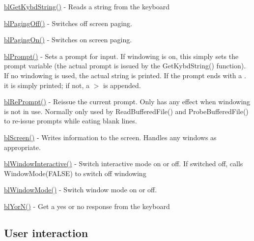\begin{DoxyItemize}
\item \hyperlink{_wind_i_o_8c_a2287dad2ad5b0cc2da7febccbb381883}{bl\-Get\-Kybd\-String()} -\/ Reads a string from the keyboard
\item \hyperlink{_wind_i_o_8c_a9cb4c1f0af3d1a43344ea43e7afc06d6}{bl\-Paging\-Off()} -\/ Switches off screen paging.
\item \hyperlink{_wind_i_o_8c_adf5e91712535d73909121b7b676b5af8}{bl\-Paging\-On()} -\/ Switches on screen paging.
\item \hyperlink{_wind_i_o_8c_ad7d9c635098851044f5e311e73c70ead}{bl\-Prompt()} -\/ Sets a prompt for input. If windowing is on, this simply sets the prompt variable (the actual prompt is issued by the Get\-Kybd\-String() function). If no windowing is used, the actual string is printed. If the prompt ends with a . it is simply printed; if not, a $>$ is appended.
\item \hyperlink{_wind_i_o_8c_a64719533d3bc93c3763afe7461a22844}{bl\-Re\-Prompt()} -\/ Reissue the current prompt. Only has any effect when windowing is not in use. Normally only used by Read\-Buffered\-File() and Probe\-Buffered\-File() to re-\/issue prompts while eating blank lines.
\item \hyperlink{_wind_i_o_8c_a47350d0b7190f1755a8bd73455fec94e}{bl\-Screen()} -\/ Writes information to the screen. Handles any windows as appropriate.
\item \hyperlink{_wind_i_o_8c_a25b25603f56047b205c78b6621becf5e}{bl\-Window\-Interactive()} -\/ Switch interactive mode on or off. If switched off, calls Window\-Mode(\-F\-A\-L\-S\-E) to switch off windowing
\item \hyperlink{_wind_i_o_8c_a8303a84d835d5e3a39eba81632d95e5f}{bl\-Window\-Mode()} -\/ Switch window mode on or off.
\item \hyperlink{_wind_i_o_8c_a9acc08a644bc6780948eb6b1e962efdb}{bl\-Yor\-N()} -\/ Get a yes or no response from the keyboard
\end{DoxyItemize}

\subsection*{User interaction }


